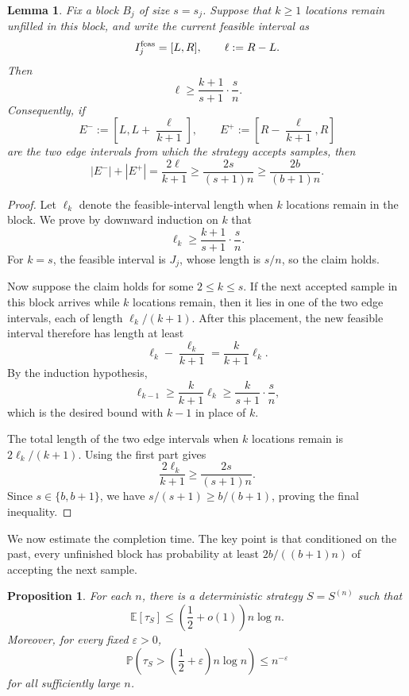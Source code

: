 \documentclass[11pt,reqno,letterpaper]{amsart}
\newtheorem{proposition}[theorem]{Proposition}
\newtheorem{lemma}[theorem]{Lemma}
\theoremstyle{definition}
\numberwithin{equation}{section}
\renewcommand{\P}{\mathbb{P}}
\newcommand{\eps}{\varepsilon}
\newcommand{\mb}{\mathbb}
\begin{document}
\begin{lemma}\label{lem:feasible-length}
Fix a block \(B_j\) of size \(s=s_j\). Suppose that \(k\ge1\) locations remain unfilled in this block, and write the current feasible interval as
\[
I_j^{\rm feas}=[L,R],
\qquad
\ell:=R-L.
\]
Then
\[
\ell\ge \frac{k+1}{s+1}\cdot \frac{s}{n}.
\]
Consequently, if
\[
E^-:=\left[L,L+\frac{\ell}{k+1}\right],
\qquad
E^+:=\left[R-\frac{\ell}{k+1},R\right]
\]
are the two edge intervals from which the strategy accepts samples, then
\[
|E^-|+|E^+|
=
\frac{2\ell}{k+1}
\ge
\frac{2s}{(s+1)n}
\ge
\frac{2b}{(b+1)n}.
\]
\end{lemma}

\begin{proof}
Let \(\ell_k\) denote the feasible-interval length when \(k\) locations remain in the block. We prove by downward induction on \(k\) that
\[
\ell_k\ge \frac{k+1}{s+1}\cdot \frac{s}{n}.
\]
For \(k=s\), the feasible interval is \(J_j\), whose length is \(s/n\), so the claim holds.

Now suppose the claim holds for some \(2\le k\le s\). If the next accepted sample in this block arrives while \(k\) locations remain, then it lies in one of the two edge intervals, each of length \(\ell_k/(k+1)\). After this placement, the new feasible interval therefore has length at least
\[
\ell_k-\frac{\ell_k}{k+1}
=
\frac{k}{k+1}\ell_k.
\]
By the induction hypothesis,
\[
\ell_{k-1}
\ge
\frac{k}{k+1}\ell_k
\ge
\frac{k}{s+1}\cdot \frac{s}{n},
\]
which is the desired bound with \(k-1\) in place of \(k\).

The total length of the two edge intervals when \(k\) locations remain is \(2\ell_k/(k+1)\). Using the first part gives
\[
\frac{2\ell_k}{k+1}
\ge
\frac{2s}{(s+1)n}.
\]
Since \(s\in\{b,b+1\}\), we have \(s/(s+1)\ge b/(b+1)\), proving the final inequality.
\end{proof}




We now estimate the completion time. The key point is that conditioned on the past, every unfinished block has probability at least \(2b/((b+1)n)\) of accepting the next sample.

\begin{proposition}\label{prop:upper-explicit}
For each \(n\), there is a deterministic strategy \(S=S^{(n)}\) such that
\[
\mb{E}[\tau_{S}]\le \left(\frac12+o(1)\right)n\log n.
\]
Moreover, for every fixed \(\eps>0\),
\[
\P\left(\tau_{S}>\left(\frac12+\eps\right)n\log n\right)\le n^{-\eps}
\]
for all sufficiently large \(n\).
\end{proposition}
\end{document}

